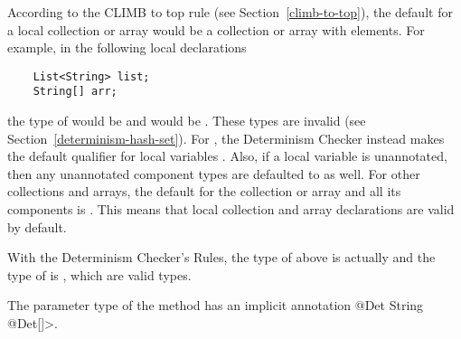 
According to the CLIMB to top rule (see Section~\ref{climb-to-top}), the default
for a local collection or array would be a  collection or array
with  elements. For example, in the following local declarations
\begin{Verbatim}
    List<String> list;
    String[] arr;
\end{Verbatim}
the type of  would be  and
 would be . These types are invalid (see
Section~\ref{determinism-hash-set}). For , the Determinism Checker
instead makes the default qualifier for local variables . Also, if a local
 variable is unannotated, then any unannotated component types are
defaulted to  as well. For other collections and arrays, the default
for the collection or array and all its components is . This means
that local collection and array declarations are valid by default.

With the Determinism Checker's Rules, the type of  above is actually
 and the type of  is , which are valid types.

The parameter type of the  method has an implicit annotation
\<@Det String @Det[]>.

